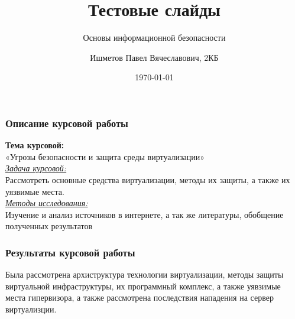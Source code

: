 \documentclass{beamer}
\title{Тестовые слайды}
\subtitle{Основы информационной безопасности}
\author{Ишметов Павел Вячеславович, 2КБ}
\date{\today}
\institute{БФУ им. И.Канта}
\begin{document}
\begin{frame}
\titlepage
\end{frame}

\begin{frame}
\frametitle{Описание курсовой работы}
	\begin{center}
		
\textbf{Тема курсовой:}\\
«Угрозы безопасности и защита среды виртуализации»\\

\underline{\textit{Задача курсовой:}}\\
Рассмотреть основные средства виртуализации, методы их защиты, а также их уязвимые места.\\

\underline{\textit{Методы исследования:}}\\
Изучение и анализ источников в интернете, а так же литературы, обобщение полученных результатов

	\end{center}
\end{frame}

\begin{frame}
\frametitle{Результаты курсовой работы}
Была рассмотрена архиструктура технологии виртуализации, методы защиты виртуальной инфраструктуры, их программный комплекс, а также уявзимые места гипервизора, а также рассмотрена последствия нападения на сервер виртуализции.

\end{frame}
\end{document}
